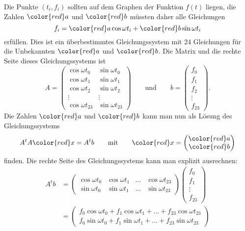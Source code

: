 
\begin{loesung}
Die Punkte $(t_i,f_i)$ sollten auf dem Graphen der Funktion $f(t)$ liegen,
die Zahlen $\color{red}a$ und $\color{red}b$ müssten daher alle Gleichungen
\[
f_i = {\color{red}a}\cos\omega t_i + {\color{red}b} \sin\omega t_i
\]
erfüllen.
Dies ist ein überbestimmtes Gleichungssystem mit 24 Gleichungen für 
die Unbekannten $\color{red}a$ und $\color{red}b$.
Die Matrix und die rechte Seite dieses Gleichungssystems ist
\[
A
=
\begin{pmatrix}
\cos \omega t_0&\sin\omega t_0\\
\cos \omega t_1&\sin\omega t_1\\
\cos \omega t_2&\sin\omega t_2\\
\vdots         &\vdots        \\
\cos \omega t_{23}&\sin\omega t_{23}
\end{pmatrix}
\qquad
\text{und}
\qquad
b
=
\begin{pmatrix}
f_0\\
f_1\\
f_2\\
\vdots\\
f_{23}
\end{pmatrix}.
\]
Die Zahlen $\color{red}a$ und $\color{red}b$ kann man nun als Lösung
des Gleichungssystems
\[
A^tA{\color{red}x}=A^tb
\qquad\text{mit}\qquad
{\color{red}x}
=
\begin{pmatrix}
\color{red}a\\
\color{red}b
\end{pmatrix}
\]
finden.
Die rechte Seite des Gleichungssystems kann man explizit ausrechnen:
\begin{align*}
A^tb
&=
\begin{pmatrix}
\cos\omega t_0&\cos\omega t_1&\dots&\cos\omega t_{23}\\
\sin\omega t_0&\sin\omega t_1&\dots&\sin\omega t_{23}
\end{pmatrix}
\begin{pmatrix}
f_0\\f_1\\\vdots\\f_{23}
\end{pmatrix}
\\
&=
\begin{pmatrix}
f_0\cos\omega t_0 + f_1\cos\omega t_1+\dots+f_{23}\cos\omega t_{23}\\
f_0\sin\omega t_0 + f_1\sin\omega t_1+\dots+f_{23}\sin\omega t_{23}
\end{pmatrix}

\end{align*}
\end{loesung}
